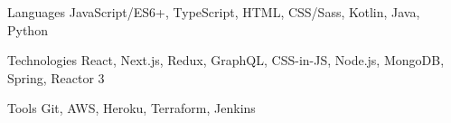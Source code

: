 

\begin{cvmyskills}

  \cvmyskill
    {Languages} %
    {JavaScript/ES6+, TypeScript, HTML, CSS/Sass, Kotlin, Java, Python} %

  \cvmyskill
    {Technologies} %
    {React, Next.js, Redux, GraphQL, CSS-in-JS, Node.js, MongoDB, Spring, Reactor 3} %

  \cvmyskill
    {Tools} %
    {Git, AWS, Heroku, Terraform, Jenkins} %


\end{cvmyskills}
